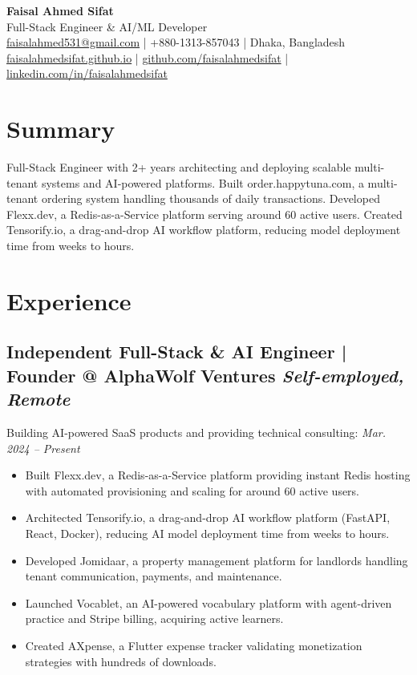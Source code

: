 \documentclass[letterpaper,10pt]{article}
\begin{document}
\pagestyle{empty} %

\begin{center}
    {\Huge \bfseries Faisal Ahmed Sifat} \\
    \vspace{2pt}
    Full-Stack Engineer \& AI/ML Developer \\
    \vspace{2pt}
    \href{mailto:faisalahmed531@gmail.com}{faisalahmed531@gmail.com} | +880-1313-857043 | Dhaka, Bangladesh \\
    \href{https://faisalahmedsifat.github.io}{faisalahmedsifat.github.io} | \href{https://github.com/faisalahmedsifat}{github.com/faisalahmedsifat} | \href{https://linkedin.com/in/faisalahmedsifat}{linkedin.com/in/faisalahmedsifat}
\end{center}
\vspace{-5pt} %

\section*{Summary}
\RaggedRight
Full-Stack Engineer with 2+ years architecting and deploying scalable multi-tenant systems and AI-powered platforms. Built order.happytuna.com, a multi-tenant ordering system handling thousands of daily transactions. Developed Flexx.dev, a Redis-as-a-Service platform serving around 60 active users. Created Tensorify.io, a drag-and-drop AI workflow platform, reducing model deployment time from weeks to hours.

\section*{Experience}

\subsection*{\textbf{Independent Full-Stack \& AI Engineer | Founder @ AlphaWolf Ventures} \hfill \textit{Self-employed, Remote}}
Building AI-powered SaaS products and providing technical consulting:
\textit{Mar. 2024 – Present}
\begin{itemize}
    \item Built Flexx.dev, a Redis-as-a-Service platform providing instant Redis hosting with automated provisioning and scaling for around 60 active users.
    \item Architected Tensorify.io, a drag-and-drop AI workflow platform (FastAPI, React, Docker), reducing AI model deployment time from weeks to hours.
    \item Developed Jomidaar, a property management platform for landlords handling tenant communication, payments, and maintenance.
    \item Launched Vocablet, an AI-powered vocabulary platform with agent-driven practice and Stripe billing, acquiring active learners.
    \item Created AXpense, a Flutter expense tracker validating monetization strategies with hundreds of downloads.
\end{itemize}
\end{document}
